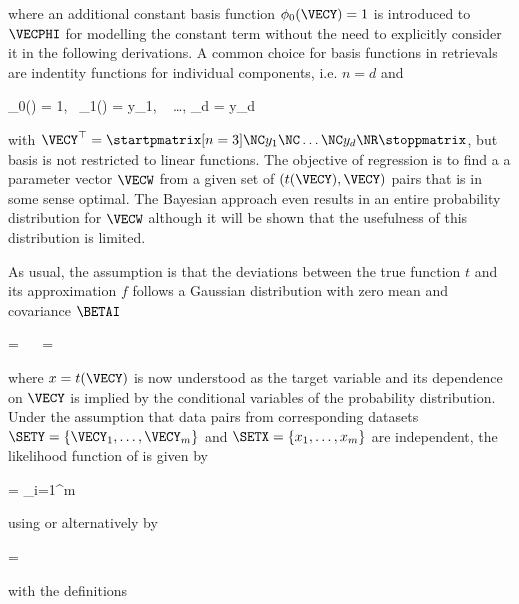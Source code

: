     where an additional constant basis function $\phi_0(\VECY) = 1$ is
    introduced to $\VECPHI$ for modelling the constant term without the need to
    explicitly consider it in the following derivations. A common choice for
    basis functions in retrievals are indentity functions for individual
    components, i.e. $n = d$ and

    \startformula
        \phi_0(\VECY) = 1,~ \phi_1(\VECY) = y_1, ~ \dots, \phi_d = y_d
    \stopformula

    with $\VECY^\top = \startpmatrix[n=3] \NC y_1 \NC \dots \NC y_d \NR \stoppmatrix$,
    but basis is not restricted to linear functions. The objective of
    regression is to find a a parameter vector $\VECW$ from a given set of
    $(t(\VECY), \VECY)$ pairs that is in some sense optimal. The Bayesian
    approach even results in an entire probability distribution for $\VECW$
    although it will be shown that the usefulness of this distribution is
    limited.

    As usual, the assumption is that the deviations between the true function
    $t$ and its approximation $f$ follows a Gaussian distribution with zero
    mean and covariance $\BETAI$

    \placeformula
    \startformula
    \startalign[n=3,align={left,right,left}]
        \NC \NC {} = \NC
                 \NR
        \NC \Rightarrow~~ \NC {} = \NC
             \EQCOMMA {}
    \stopalign
    \stopformula

    where $x = t(\VECY)$ is now understood as the target variable and its
    dependence on $\VECY$ is implied by the conditional variables of the
    probability distribution. Under the assumption that data pairs from
    corresponding datasets $\SETY = \{ \VECY_1, \dots, \VECY_m \}$ and $\SETX
    = \{ x_1, \dots, x_m \}$ are independent, the likelihood function of
    is given by

    \startformula
        \RLIKELIHOOD = \prod_{i=1}^{m} 
    \stopformula
    
    using  or alternatively by

    \startformula
        \RLIKELIHOOD = \GAUSS{\VECX}{\MATPHI \VECW}{\BETAI \MATID}
    \stopformula
    
    with the definitions

